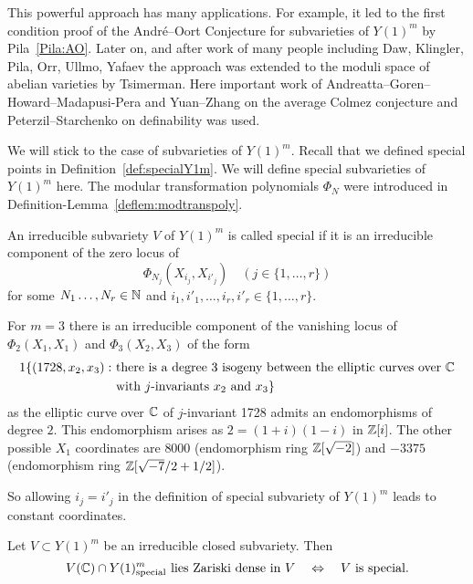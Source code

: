 This powerful approach has many applications. For example, it led to
the first condition proof of the Andr\'e--Oort Conjecture for
subvarieties of $Y(1)^m$ by Pila~\ref{Pila:AO}. Later on, and after work of
many people including Daw, Klingler, Pila, Orr, Ullmo, Yafaev the
approach was extended to the moduli space of abelian varieties by
Tsimerman. Here important work of
Andreatta--Goren--Howard--Madapusi-Pera and Yuan--Zhang on the average
Colmez conjecture and Peterzil--Starchenko on definability was used.

We will stick to the case of subvarieties of $Y(1)^m$.
Recall that we defined special points in
Definition~\ref{def:specialY1m}. We will define special subvarieties
of $Y(1)^m$ here. The modular transformation polynomials $\Phi_N$
were introduced in Definition-Lemma~\ref{deflem:modtranspoly}. 

\begin{definition}
  An irreducible subvariety $V$ of $Y(1)^m$ is called special if it is
  an irreducible component of the zero locus of
  \begin{equation*}
    \Phi_{N_j}(X_{i_j},X_{i'_j}) \quad (j\in \{1,\ldots,r\})
  \end{equation*}
  for some  $N_1\ldots,N_r\in{\mathbb{N}}$ and $i_1,i'_1,\ldots,i_r,i'_r\in
  \{1,\ldots,r\}$. 
\end{definition}

\begin{example}
  For $m=3$ there is an irreducible component of the vanishing locus of
  $\Phi_2(X_1,X_1)$ and $\Phi_3(X_2,X_3)$ of the form
  \begin{alignat*}1
    \{(1728,x_2,x_3) : \,\,&\text{there is a degree $3$ isogeny between
      the elliptic curves over $\IC$}\\ &\text{with $j$-invariants $x_2$ and $x_3$}\}
  \end{alignat*}
  as the elliptic curve over ${\mathbb{C}}$  of $j$-invariant 1728
  admits an endomorphisms of degree $2$. This endomorphism arises as
  $2 = (1+i)(1-i)$ in ${\mathbb{Z}}[i]$. The other possible $X_1$ 
  coordinates are $8000$ (endomorphism ring ${\mathbb{Z}}[\sqrt{-2}]$) and
  $-3375$ (endomorphism ring ${\mathbb{Z}}[\sqrt{-7}/2+1/2]$).

  So allowing $i_j=i'_j$ in the definition of special subvariety of
  $Y(1)^m$ leads to constant coordinates. 
\end{example}

\begin{theorem}
  Let $V\subset Y(1)^m$ be an irreducible closed subvariety. Then
  \begin{equation*}
    V({\mathbb{C}}) \cap Y(1)^m_{\mathrm{special}} \text{ lies Zariski dense in
      $V$}\quad\Leftrightarrow \quad
    \text{$V$ is special.}
  \end{equation*}    
\end{theorem}

